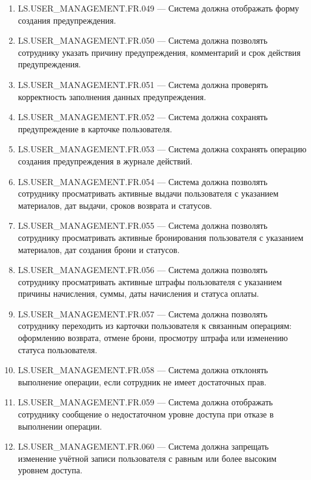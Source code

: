 \documentclass[12pt,a4paper]{article}
\begin{document}
\begin{enumerate}
		\item LS.USER\_MANAGEMENT.FR.049 --- Система должна отображать форму создания
		предупреждения.
		
		\item LS.USER\_MANAGEMENT.FR.050 --- Система должна позволять сотруднику
		указать причину предупреждения, комментарий и срок действия предупреждения.
		
		\item LS.USER\_MANAGEMENT.FR.051 --- Система должна проверять корректность
		заполнения данных предупреждения.
		
		\item LS.USER\_MANAGEMENT.FR.052 --- Система должна сохранять предупреждение
		в карточке пользователя.
		
		\item LS.USER\_MANAGEMENT.FR.053 --- Система должна сохранять операцию
		создания предупреждения в журнале действий.
		
		\item LS.USER\_MANAGEMENT.FR.054 --- Система должна позволять сотруднику
		просматривать активные выдачи пользователя с указанием материалов, дат выдачи,
		сроков возврата и статусов.
		
		\item LS.USER\_MANAGEMENT.FR.055 --- Система должна позволять сотруднику
		просматривать активные бронирования пользователя с указанием материалов, дат
		создания брони и статусов.
		
		\item LS.USER\_MANAGEMENT.FR.056 --- Система должна позволять сотруднику
		просматривать активные штрафы пользователя с указанием причины начисления,
		суммы, даты начисления и статуса оплаты.
		
		\item LS.USER\_MANAGEMENT.FR.057 --- Система должна позволять сотруднику
		переходить из карточки пользователя к связанным операциям: оформлению возврата,
		отмене брони, просмотру штрафа или изменению статуса пользователя.
		
		\item LS.USER\_MANAGEMENT.FR.058 --- Система должна отклонять выполнение
		операции, если сотрудник не имеет достаточных прав.
		
		\item LS.USER\_MANAGEMENT.FR.059 --- Система должна отображать сотруднику
		сообщение о недостаточном уровне доступа при отказе в выполнении операции.
		
		\item LS.USER\_MANAGEMENT.FR.060 --- Система должна запрещать изменение
		учётной записи пользователя с равным или более высоким уровнем доступа.
		

\end{enumerate}
\end{document}
